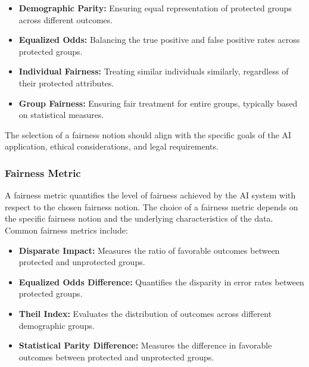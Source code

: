 \begin{itemize}
  
    \item \textbf{Demographic Parity:} Ensuring equal representation of protected groups across different outcomes.
  
    \item \textbf{Equalized Odds:} Balancing the true positive and false positive rates across protected groups.
  
    \item \textbf{Individual Fairness:} Treating similar individuals similarly, regardless of their protected attributes.
   
    \item \textbf{Group Fairness:} Ensuring fair treatment for entire groups, typically based on statistical measures.

\end{itemize}

The selection of a fairness notion should align with the specific goals of the AI application, ethical considerations, and legal requirements.

\subsubsection{Fairness Metric}

A fairness metric quantifies the level of fairness achieved by the AI system with respect to the chosen fairness notion. The choice of a fairness metric depends on the specific fairness notion and the underlying characteristics of the data. Common fairness metrics include:

\begin{itemize}
   
    \item \textbf{Disparate Impact:} Measures the ratio of favorable outcomes between protected and unprotected groups.
   
    \item \textbf{Equalized Odds Difference:} Quantifies the disparity in error rates between protected groups.
   
    \item \textbf{Theil Index:} Evaluates the distribution of outcomes across different demographic groups.
   
    \item \textbf{Statistical Parity Difference:} Measures the difference in favorable outcomes between protected and unprotected groups.

\end{itemize}


